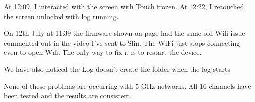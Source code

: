   At 12:09, I interacted with the screen with Touch frozen.
  At 12:22, I retouched the screen unlocked with log running.

  On 12th July at 11:39 the firmware shown on page \pageref{sec:firmware20240705151015} had the same old Wifi issue commented out in the video I've sent to Slin.
  The WiFi just stops connecting even to open Wifi. The only way to fix it is to restart the device.

  We have also noticed the Log doesn't create the folder when the log starts

  None of these problems are occurring with 5 GHz networks. All 16 channels have been tested and the results are consistent.
